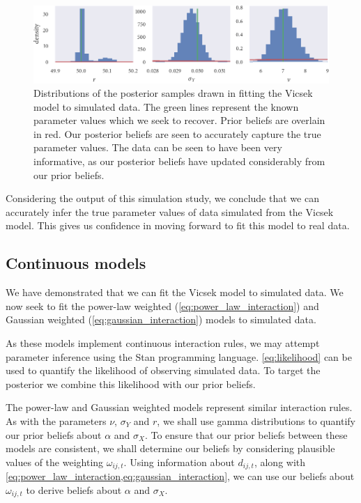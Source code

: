 \begin{figure}[tbp]
  \includegraphics{r_hist.pdf}
  \caption{Distributions of the posterior samples drawn in fitting the Vicsek
    model to simulated data. The green lines represent the known parameter
    values which we seek to recover. Prior beliefs are overlain in red. Our
    posterior beliefs are seen to accurately capture the true parameter
    values. The data can be seen to have been very informative, as our posterior
    beliefs have updated considerably from our prior beliefs.}
  \label{fig:vicsek_hist}
\end{figure}

Considering the output of this simulation study, we conclude that we can
accurately infer the true parameter values of data simulated from the Vicsek
model. This gives us confidence in moving forward to fit this model to real
data.

\subsection{Continuous models}
\label{ssec:continuous_models}

We have demonstrated that we can fit the Vicsek model to simulated data.  We
now seek to fit the power-law weighted (\cref{eq:power_law_interaction}) and
Gaussian weighted (\cref{eq:gaussian_interaction}) models to simulated data.

As these models implement continuous interaction rules, we may attempt
parameter inference using the Stan programming language. \cref{eq:likelihood}
can be used to quantify the likelihood of observing simulated data. To target
the posterior we combine this likelihood with our prior beliefs.

The power-law and Gaussian weighted models represent similar interaction rules.
As with the parameters $\nu$, $\sigma_Y$ and $r$, we shall use gamma
distributions to quantify our prior beliefs about $\alpha$ and $\sigma_X$.  To
ensure that our prior beliefs between these models are consistent, we shall
determine our beliefs by considering plausible values of the weighting
$\omega_{ij,t}$. Using information about $d_{ij,t}$, along with
\cref{eq:power_law_interaction,eq:gaussian_interaction}, we can use our beliefs
about $\omega_{ij,t}$ to derive beliefs about $\alpha$ and $\sigma_X$.

